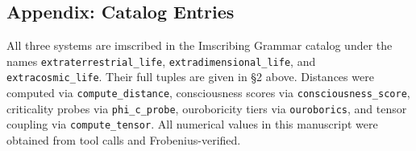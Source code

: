 \documentclass[12pt,a4paper]{article}
\newcommand{\pilcrow}{\S}
\begin{document}
\subsection{Appendix: Catalog Entries}

All three systems are imscribed in the Imscribing Grammar catalog under the names \texttt{extraterrestrial\_life}, \texttt{extradimensional\_life}, and \texttt{extracosmic\_life}. Their full tuples are given in \pilcrow{}2 above. Distances were computed via \texttt{compute\_distance}, consciousness scores via \texttt{consciousness\_score}, criticality probes via \texttt{phi\_c\_probe}, ouroboricity tiers via \texttt{ouroborics}, and tensor coupling via \texttt{compute\_tensor}. All numerical values in this manuscript were obtained from tool calls and Frobenius-verified.
\end{document}
